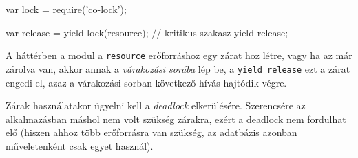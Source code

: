 \begin{js}
  var lock = require('co-lock');

  var release = yield lock(resource);
  // kritikus szakasz
  yield release;
\end{js}

A háttérben a modul a \verb=resource= erőforráshoz egy zárat hoz létre,
vagy ha az már zárolva van, akkor annak a \emph{várakozási sorába} lép be,
a \verb=yield release= ezt a zárat engedi el, azaz a várakozási sorban
következő hívás hajtódik végre.

Zárak használatakor ügyelni kell a \emph{deadlock} elkerülésére.
Szerencsére az alkalmazásban máshol nem volt szükség zárakra, ezért
a deadlock nem fordulhat elő (hiszen ahhoz több erőforrásra van szükség,
az adatbázis azonban műveletenként csak egyet használ).
